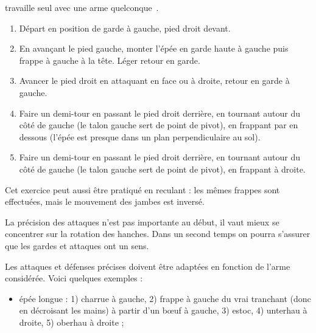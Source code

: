 \begin{exercice}



	\A travaille seul avec une arme quelconque~\footnotemark{}.

	\begin{enumerate}
		\item Départ en position de garde à gauche, pied droit devant.
		
		\item En avançant le pied gauche, monter l'épée en garde haute à gauche puis frappe à gauche à la tête.
		Léger retour en garde.
		
		\item Avancer le pied droit en attaquant en face ou à droite, retour en garde à gauche.
		
		\item Faire un demi-tour en passant le pied droit derrière, en tournant autour du côté de gauche (le talon gauche sert de point de pivot), en frappant par en dessous (l'épée est presque dans un plan perpendiculaire au sol).
		
		\item Faire un demi-tour en passant le pied droit derrière, en tournant autour du côté de gauche (le talon gauche sert de point de pivot), en frappant à droite.
	\end{enumerate}
	Cet exercice peut aussi être pratiqué en reculant : les mêmes frappes sont effectuées, mais le mouvement des jambes est inversé.

	La précision des attaques n'est pas importante au début, il vaut mieux se concentrer sur la rotation des hanches.
	Dans un second temps on pourra s'assurer que les gardes et attaques ont un sens.

	Les attaques et défenses précises doivent être adaptées en fonction de l'arme considérée.
	Voici quelques exemples :
	\begin{itemize}
		\item épée longue : 1) charrue à gauche, 2) frappe à gauche du vrai tranchant (donc en décroisant les mains) à partir d'un bœuf à gauche, 3) estoc, 4) unterhau à droite, 5) oberhau à droite ;
		

\end{itemize}
\end{exercice}
